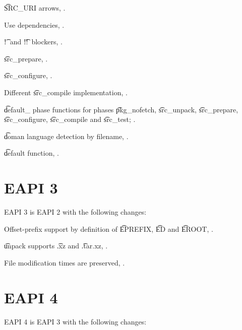 \begin{compactitem}
\item \t{SRC_URI} arrows, .
\item Use dependencies, .
\item \t{!}\ and \t{!!}\ blockers, .
\item \t{src_prepare}, .
\item \t{src_configure}, .
\item Different \t{src_compile} implementation, .
\item \t{default_} phase functions for phases \t{pkg_nofetch}, \t{src_unpack}, \t{src_prepare},
    \t{src_configure}, \t{src_compile} and \t{src_test}; .
\item \t{doman} language detection by filename, .
\item \t{default} function, .
\end{compactitem}

\section{EAPI 3}

EAPI 3 is EAPI 2 with the following changes:
\begin{compactitem}
\item Offset-prefix support by definition of \t{EPREFIX}, \t{ED} and \t{EROOT},
    .
\item \t{unpack} supports \t{.xz} and \t{.tar.xz}, .
\item File modification times are preserved, .
\end{compactitem}

\section{EAPI 4}

EAPI 4 is EAPI 3 with the following changes:

